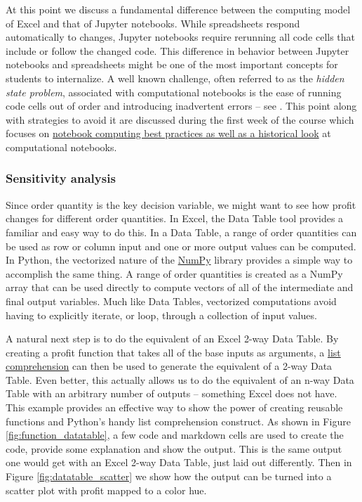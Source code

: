 \documentclass[ited,blindrev]{informs3}              %
\begin{document}
At this point we discuss a fundamental difference between the computing model of Excel and that of Jupyter notebooks. While spreadsheets respond automatically to changes, Jupyter notebooks require rerunning all code cells that include or follow the changed code. This difference in behavior between Jupyter notebooks and spreadsheets might be one of the most important concepts for students to internalize. A well known challenge, often referred to as the \textit{hidden state problem}, associated with computational notebooks is the ease of running code cells out of order and introducing inadvertent errors -- see \citet{johnson2020benefits,grusDonNotebooks2018}. This point along with strategies to avoid it are discussed during the first week of the course which focuses on \href{http://www.sba.oakland.edu/faculty/isken/courses/aap/jupyter_notebooks.html}{notebook computing best practices as well as a historical look} at computational notebooks.

\subsubsection{Sensitivity analysis}

Since order quantity is the key decision variable, we might want to see how profit changes for different order quantities. In Excel, the Data Table tool provides a familiar and easy way to do this. In a Data Table, a range of order quantities can be used as row or column input and one or more output values can be computed. In Python, the vectorized nature of the \href{https://numpy.org/}{NumPy} library \citep{harris2020array} provides a simple way to accomplish the same thing. A range of order quantities is created as a NumPy array that can be used directly to compute vectors of all of the intermediate and final output variables. Much like Data Tables, vectorized computations avoid having to explicitly iterate, or loop, through a collection of input values.

A natural next step is to do the equivalent of an Excel 2-way Data Table. By creating a profit function that takes all of the base inputs as arguments, a \href{https://realpython.com/list-comprehension-python/}{list comprehension} can then be used to generate the equivalent of a 2-way Data Table. Even better, this actually allows us to do the equivalent of an n-way Data Table with an arbitrary number of outputs -- something Excel does not have. This example provides an effective way to show the power of creating reusable functions and Python's handy list comprehension construct. As shown in Figure \ref{fig:function_datatable}, a few code and markdown cells are used to create the code, provide some explanation and show the output. This is the same output one would get with an Excel 2-way Data Table, just laid out differently. Then in Figure \ref{fig:datatable_scatter} we show how the output can be turned into a scatter plot with profit mapped to a color hue.
\end{document}
